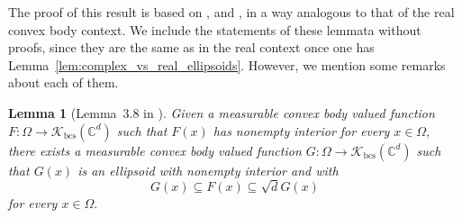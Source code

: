 \documentclass{article}
\newtheorem{lemma}[theorem]{Lemma}
\theoremstyle{definition}
\theoremstyle{remark}
\numberwithin{equation}{section}
\newcommand{\cK}{\mathcal{K}}
\newcommand{\complex}{\mathbb{C}}
\newcommand{\convex}{\cK_{\mathrm{bcs}}}
\newcommand{\1}{\mathbf{1}}
\begin{document}
    The proof of this result is based on \cite[Lemma~3.8]{Cruz_Uribe_Bownik_Extrapolation},
    \cite[Lemma~3.9]{Cruz_Uribe_Bownik_Extrapolation}
    and \cite[Lemma~3.10]{Cruz_Uribe_Bownik_Extrapolation},
    in a way analogous to that of the real convex body context.
    We include the statements of these lemmata without proofs, since they are the same as in the real context once one has Lemma~\ref{lem:complex_vs_real_ellipsoids}.
    However, we mention some remarks about each of them.

    \begin{lemma}[Lemma~3.8 in \cite{Cruz_Uribe_Bownik_Extrapolation}]
        \label{lemma:JohnEllipsoidMeasurability}
        Given a measurable convex body valued function $F\colon \Omega \rightarrow \convex(\complex^d)$ such that $F(x)$ has nonempty interior for every $x \in \Omega,$
        there exists a measurable convex body valued function $G\colon \Omega \rightarrow \convex(\complex^d)$ such that $G(x)$ is an ellipsoid with nonempty interior and with
        \begin{equation}
            \label{eq:JohnEllipsoidInclusions}
            G(x) \subseteq F(x) \subseteq \sqrt{d} G(x)
        \end{equation}
        for every $x \in \Omega.$
    \end{lemma}
\end{document}

